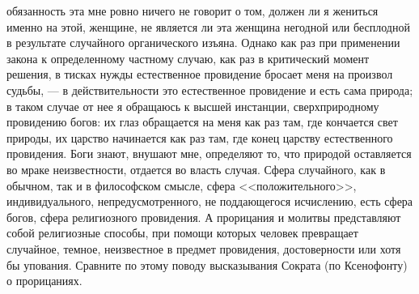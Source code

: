 \documentclass[12pt,oneside]{book}
\begin{document}
обязанность эта мне ровно ничего не говорит о том, должен ли я жениться именно на этой, женщине, не является ли эта женщина негодной или бесплодной в результате случайного органического изъяна. Однако как раз при применении закона к определенному частному случаю, как раз в критический момент решения, в тисках нужды естественное провидение бросает меня на произвол судьбы, --- в действительности это естественное провидение и есть сама природа; в таком случае от нее я обращаюсь к высшей инстанции, сверхприродному провидению богов: их глаз обращается на меня как раз там, где кончается свет природы, их царство начинается как раз там, где конец царству естественного провидения. Боги знают, внушают мне, определяют то, что природой оставляется во мраке неизвестности, отдается во власть случая. Сфера случайного, как в обычном, так и в философском смысле, сфера <<положительного>>, индивидуального, непредусмотренного, не поддающегося исчислению, есть сфера богов, сфера религиозного провидения. А прорицания и молитвы представляют собой религиозные способы, при помощи которых человек превращает случайное, темное, неизвестное в предмет провидения, достоверности или хотя бы упования. Сравните по этому поводу высказывания Сократа (по Ксенофонту) о прорицаниях.



\chapter{}
\end{document}
